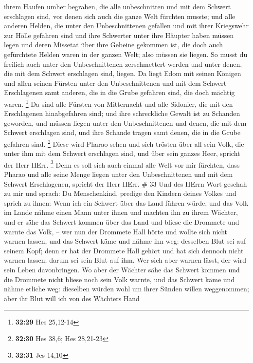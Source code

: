 ihrem Haufen umher begraben, die alle unbeschnitten und mit dem Schwert
erschlagen sind, vor denen sich auch die ganze Welt fürchten musste;
 und alle anderen Helden, die unter den Unbeschnittenen
gefallen und mit ihrer Kriegswehr zur Hölle gefahren sind und ihre
Schwerter unter ihre Häupter haben müssen legen und deren Missetat über
ihre Gebeine gekommen ist, die doch auch gefürchtete Helden waren in der
ganzen Welt; also müssen sie liegen.  So musst du freilich
auch unter den Unbeschnittenen zerschmettert werden und unter denen, die
mit dem Schwert erschlagen sind, liegen.  Da liegt Edom mit
seinen Königen und allen seinen Fürsten unter den Unbeschnittenen und
mit dem Schwert Erschlagenen samt anderen, die in die Grube gefahren
sind, die doch mächtig waren. \footnote{\textbf{32:29} Hes 25,12-14}
 Da sind alle Fürsten von Mitternacht und alle Sidonier,
die mit den Erschlagenen hinabgefahren sind; und ihre schreckliche
Gewalt ist zu Schanden geworden, und müssen liegen unter den
Unbeschnittenen und denen, die mit dem Schwert erschlagen sind, und ihre
Schande tragen samt denen, die in die Grube gefahren sind. \footnote{\textbf{32:30}
  Hes 38,6; Hes 28,21-23}  Diese wird Pharao sehen und sich
trösten über all sein Volk, die unter ihm mit dem Schwert erschlagen
sind, und über sein ganzes Heer, spricht der Herr HErr. \footnote{\textbf{32:31}
  Jes 14,10}  Denn es soll sich auch einmal alle Welt vor
mir fürchten, dass Pharao und alle seine Menge liegen unter den
Unbeschnittenen und mit dem Schwert Erschlagenen, spricht der Herr HErr.
\# 33  Und des HErrn Wort geschah zu mir und sprach:
 Du Menschenkind, predige den Kindern deines Volkes und
sprich zu ihnen: Wenn ich ein Schwert über das Land führen würde, und
das Volk im Lande nähme einen Mann unter ihnen und machten ihn zu ihrem
Wächter,  und er sähe das Schwert kommen über das Land und
bliese die Drommete und warnte das Volk, --  wer nun der
Drommete Hall hörte und wollte sich nicht warnen lassen, und das Schwert
käme und nähme ihn weg: desselben Blut sei auf seinem Kopf; 
denn er hat der Drommete Hall gehört und hat sich dennoch nicht warnen
lassen; darum sei sein Blut auf ihm. Wer sich aber warnen lässt, der
wird sein Leben davonbringen.  Wo aber der Wächter sähe das
Schwert kommen und die Drommete nicht bliese noch sein Volk warnte, und
das Schwert käme und nähme etliche weg: dieselben würden wohl um ihrer
Sünden willen weggenommen; aber ihr Blut will ich von des Wächters Hand
